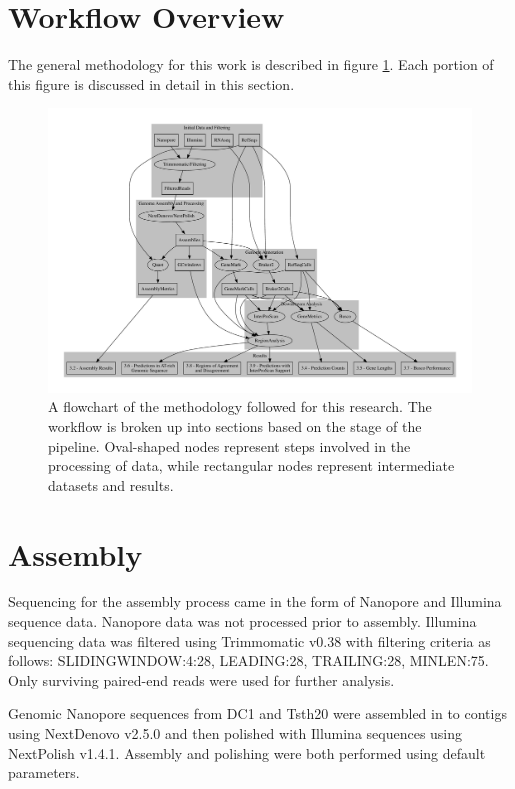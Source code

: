 \section{Workflow Overview}

The general methodology for this work is described in figure
\ref{fig:workflow}. Each portion of this figure is discussed in detail
in this section.

\begin{center}
  \begin{figure}
    \includegraphics[width=1.15\textwidth]{./figures/data-flowchart.pdf}
    \caption{A flowchart of the methodology followed for this
      research. The workflow is broken up into sections based on the
      stage of the pipeline. Oval-shaped nodes represent steps
      involved in the processing of data, while rectangular nodes
      represent intermediate datasets and results.}
    \label{fig:workflow}
  \end{figure}
\end{center}

\section{Assembly}

Sequencing for the assembly process came in the form of Nanopore and
Illumina sequence data. Nanopore data was not processed prior to
assembly. Illumina sequencing data was filtered using Trimmomatic v0.38 with
filtering criteria as follows: SLIDINGWINDOW:4:28, LEADING:28,
TRAILING:28, MINLEN:75. Only surviving paired-end reads were used for
further analysis.

Genomic Nanopore sequences from DC1 and Tsth20 were assembled in to
contigs using NextDenovo\cite{Hu02024} v2.5.0 and then polished with
Illumina sequences using NextPolish\cite{Hu2020} v1.4.1. Assembly and
polishing were both performed using default parameters.

